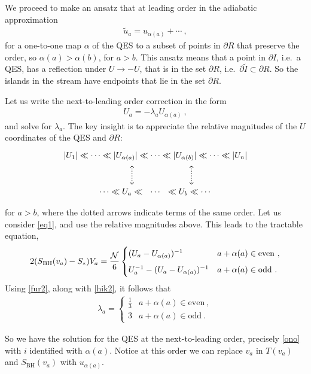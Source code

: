 \documentclass[12pt]{article}
\newcommand\SBH{S_\text{BH}}
\newcommand{\EQ}[1]{\begin{equation}\begin{split} #1
\end{split}\end{equation}}
\begin{document}
We proceed to make an ansatz that at leading order in the adiabatic approximation 
\EQ{
\tilde u_a=u_{\alpha(a)}+\cdots\ ,
\label{slm}
}
for a one-to-one map $\alpha$ of the QES to a subset of points in $\partial R$ that preserve the order, so $\alpha(a)>\alpha(b)$, for $a>b$. This ansatz means that a point in $\partial I$, i.e.~a QES, has a reflection under $U\to-U$, that is in the set $\partial R$, i.e.~$\partial\tilde I\subset\partial R$. So the islands in the stream have endpoints that lie in the set $\partial R$. 

Let  us write the next-to-leading order correction in the form 
\EQ{
U_a=-\lambda_aU_{\alpha(a)}\ ,
\label{fur2}
}
and solve for $\lambda_a$. The key insight is to appreciate the relative magnitudes of the $U$ coordinates of the QES and $\partial R$:
\EQ{
\begin{tikzpicture}[scale=1]
\node[right] at (0,0) {$|U_1|\ll \cdots \ll |U_{\alpha(a)}|\ll \cdots   \ll |U_{\alpha(b)}|\ll \cdots \ll |U_n|$};
\draw[thick,dotted,<->] (3,-0.4) -- (3,-1.2);
\draw[thick,dotted,<->] (5.5,-0.4) -- (5.5,-1.2);
\node[right] at (1.5,-1.5) {$\cdots \ll U_a\ll~ ~\cdots~~   \ll U_b\ll\cdots$};
\end{tikzpicture}
\label{ut}
}
for $a>b$, where the dotted arrows indicate terms of the same order.  Let us consider \eqref{eq1}, and use the relative magnitudes above. This leads to the tractable equation,
\EQ{
2(\SBH (v_a)-S_*)V_a=\frac{\cal N}6\begin{cases} (U_a-U_{\alpha(a)})^{-1} & a+\alpha(a)\in\text{even}\ ,\\[5pt]
U_a^{-1}-(U_a-U_{\alpha(a)})^{-1} & a+\alpha(a)\in\text{odd}\ .\end{cases}
}
Using \eqref{fur2}, along with \eqref{hik2}, it follows that
\EQ{
\lambda_a=\begin{cases} \frac13 & a+\alpha(a)\in\text{even}\ ,\\ 3 & a+\alpha(a)\in\text{odd}\ .
\end{cases}
}

So we have the solution for the QES at the next-to-leading order, precisely \eqref{ono} with $i$ identified with $\alpha(a)$. Notice at this order we can replace $v_a$ in $T(v_a)$ and $\SBH (v_a)$ with $u_{\alpha(a)}$.
\end{document}
